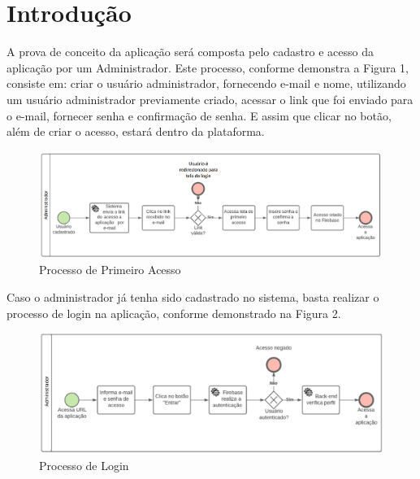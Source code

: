\documentclass[
    12pt,               %
    openright,          %
    oneside,
    a4paper,            %
    english,            %
    brazil              %
    ]{ifsp-spo-inf-ctds} %
\begin{document}
\pretextual

\imprimircapa

\listoffigures*
\cleardoublepage

\tableofcontents*

\textual

\chapter[Introdução]{Introdução}
A prova de conceito da aplicação será composta pelo cadastro e acesso da aplicação por um Administrador. Este processo, conforme demonstra a Figura 1, consiste em: criar o usuário administrador, fornecendo e-mail e nome, utilizando um usuário administrador previamente criado, acessar o link que foi enviado para o e-mail, fornecer senha e confirmação de senha. E assim que clicar no botão, além de criar o acesso, estará dentro da plataforma.

\begin{figure}[htb]
    \centering
	\includegraphics[width=16cm]{imagens/PrimeiroAcesso.png}
	\caption{Processo de Primeiro Acesso}
\end{figure}
\FloatBarrier

Caso o administrador já tenha sido cadastrado no sistema, basta realizar o processo de login na aplicação, conforme demonstrado na Figura 2.

\begin{figure}[htb]
    \centering
	\includegraphics[width=16cm]{imagens/Login.png}
	\caption{Processo de Login}
\end{figure}
\FloatBarrier
\end{document}
